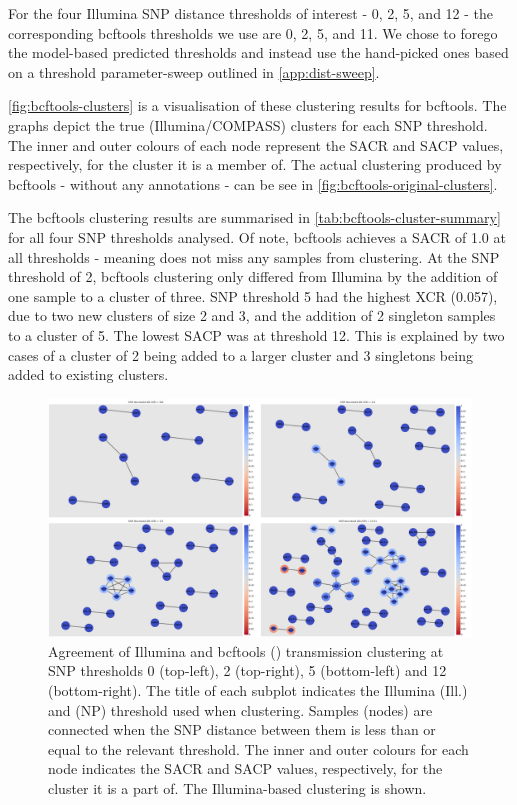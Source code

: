For the four Illumina SNP distance thresholds of interest - 0, 2, 5, and 12 - the corresponding bcftools thresholds we use are 0, 2, 5, and 11. We chose to forego the model-based predicted thresholds and instead use the hand-picked ones based on a threshold parameter-sweep outlined in \autoref{app:dist-sweep}.

\autoref{fig:bcftools-clusters} is a visualisation of these clustering results for bcftools. The graphs depict the true (Illumina/COMPASS) clusters for each SNP threshold. The inner and outer colours of each node represent the SACR and SACP values, respectively, for the cluster it is a member of. The actual clustering produced by bcftools - without any annotations - can be see in \autoref{fig:bcftools-original-clusters}.

The bcftools clustering results are summarised in \autoref{tab:bcftools-cluster-summary} for all four SNP thresholds analysed. Of note, bcftools
achieves a SACR of 1.0 at all thresholds - meaning \ont{} does not miss any samples from
clustering. At the SNP threshold of 2, bcftools clustering only differed from Illumina by the addition of one sample to a cluster of three. 
SNP threshold 5 had the highest XCR (0.057), due to two new clusters of size 2 and 3, and the addition of 2 singleton samples to a cluster of 5. 
The lowest SACP was at threshold 12. This is explained by two cases of a cluster of 2 being added to a larger cluster and 3 singletons being added to existing clusters. 

\begin{figure}
\begin{center}
\includegraphics[width=0.90\columnwidth]{Chapter2/Figs/bcftools_clusters.png}
\caption{{Agreement of Illumina and bcftools (\ont{}) transmission clustering at SNP
thresholds 0 (top-left), 2 (top-right), 5 (bottom-left) and 12 (bottom-right). The title of
each subplot indicates the Illumina (Ill.) and \ont{} (NP) threshold
used when clustering. Samples (nodes) are connected when the SNP
distance between them is less than or equal to the relevant threshold.
The inner and outer colours for each node indicates the SACR and SACP
values, respectively, for the cluster it is a part of. The
Illumina-based clustering is shown.
{\label{fig:bcftools-clusters}}%
}}
\end{center}
\end{figure}

